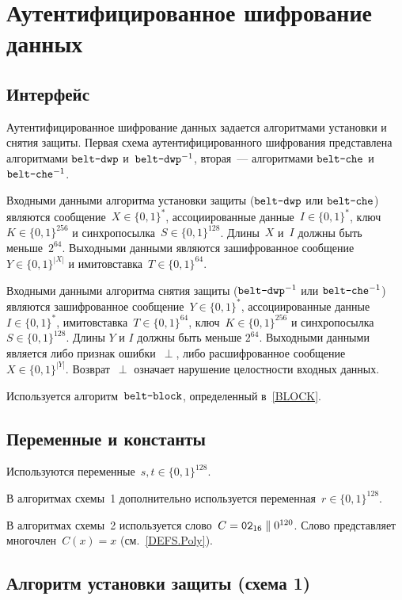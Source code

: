\section{Аутентифицированное шифрование данных}\label{AE}

\subsection{Интерфейс}\label{AE.IFace}

Аутентифицированное шифрование данных задается алгоритмами установки 
и снятия защиты. Первая схема аутентифицированного шифрования
представлена алгоритмами $\texttt{belt-dwp}$ и~$\texttt{belt-dwp}^{-1}$,
вторая~--- алгоритмами $\texttt{belt-che}$ и~$\texttt{belt-che}^{-1}$. 

Входными данными алгоритма установки защиты ($\texttt{belt-dwp}$ или
$\texttt{belt-che}$) являются сообщение~$X\in\{0,1\}^*$, ассоциированные
данные~$I\in\{0,1\}^*$, ключ~$K\in\{0,1\}^{256}$ и 
синхропосылка~$S\in\{0,1\}^{128}$. Длины~$X$ и~$I$ должны быть меньше~$2^{64}$. 
%
Выходными данными являются зашифрованное сообщение~$Y\in\{0,1\}^{|X|}$
и имитовставка~$T\in\{0,1\}^{64}$.

Входными данными алгоритма снятия защиты ($\texttt{belt-dwp}^{-1}$ или
$\texttt{belt-che}^{-1}$) являются зашифрованное
сообщение~$Y\in\{0,1\}^*$, ассоциированные данные~$I\in\{0,1\}^*$,
имитовставка~$T\in\{0,1\}^{64}$, ключ~$K\in\{0,1\}^{256}$ и синхропосылка
$S\in\{0,1\}^{128}$.
%
Длины $Y$ и $I$ должны быть меньше $2^{64}$.
%
Выходными данными является либо признак ошибки~$\perp$, либо расшифрованное 
сообщение~$X\in\{0,1\}^{|Y|}$. 
%
Возврат~$\perp$ означает нарушение целостности входных данных.

Используется алгоритм~$\texttt{belt-block}$, 
определенный в~\ref{BLOCK}.

\subsection{Переменные и константы}\label{AE.Vars}

Используются переменные~$s,t\in\{0,1\}^{128}$.

В алгоритмах схемы~1 дополнительно используется переменная~$r\in\{0,1\}^{128}$. 

В алгоритмах схемы~2 используется слово~$C=\texttt{02}_{16}\parallel 0^{120}$.
Слово представляет многочлен~$C(x)=x$ (см.~\ref{DEFS.Poly}).

\subsection{Алгоритм установки защиты (схема 1)}\label{AE.DWP.Wrap}

